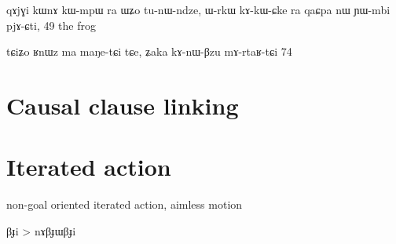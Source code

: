 \documentclass[oldfontcommands,oneside,a4paper,11pt]{article}
\begin{document}
qɤjɣi kɯnɤ kɯ-mpɯ ra ɯʑo tu-nɯ-ndze,
ɯ-rkɯ kɤ-kɯ-ɕke ra qaɕpa nɯ ɲɯ-mbi pjɤ-ɕti,
49 the frog

tɕiʑo ʁnɯz ma maŋe-tɕi tɕe, ʑaka kɤ-nɯ-βzu mɤ-rtaʁ-tɕi
74
\section{Causal clause linking}


\section{Iterated action}

non-goal oriented iterated action, aimless motion

βɟi > nɤβɟɯβɟi





 
\end{document}
